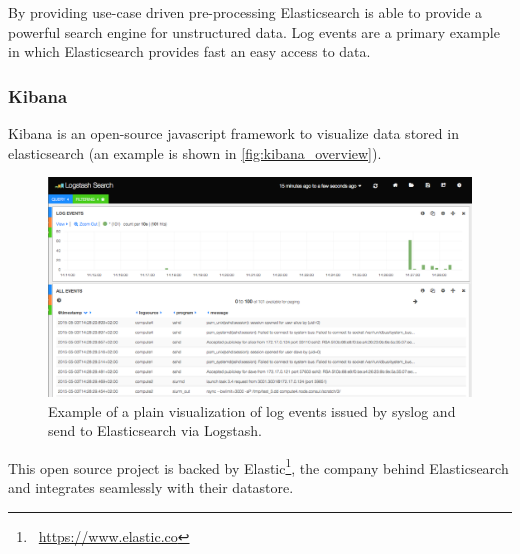 By providing use-case driven pre-processing Elasticsearch is able to provide a powerful search engine for unstructured data. Log events are a primary example in which
Elasticsearch provides fast an easy access to data.

\subsubsection{Kibana}
\label{kibana}
Kibana is an open-source javascript framework to visualize data stored in \gls{elasticsearch} (an example is shown in \autoref{fig:kibana_overview}).
\begin{figure}[!ht]
    \includegraphics[width=.4\textwidth]{images/png/kibana_overview.png}
    \caption{\label{fig:kibana_overview}Example of a plain visualization of log events issued by syslog and send to Elasticsearch via Logstash.}
\end{figure}
This open source project is backed by Elastic\footnote{\Mundus~\url{https://www.elastic.co}}, the company behind Elasticsearch and integrates
seamlessly with their datastore.
